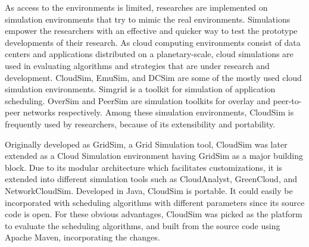 \documentclass[times, 10pt,twocolumn]{article}
\begin{document}
As access to the environments is limited, researches are implemented on simulation environments that try to mimic the real environments. Simulations empower the researchers with an effective and quicker way to test the prototype developments of their research. As cloud computing environments consist of data centers and applications distributed on a planetary-scale, cloud simulations are used in evaluating algorithms and strategies that are under research and development. CloudSim, EmuSim\cite{emusim}, and DCSim\cite{dcsim} are some of the mostly used cloud simulation environments. Simgrid\cite{simgrid} is a toolkit for simulation of application scheduling. OverSim\cite{oversim} and PeerSim\cite{peersim} are simulation toolkits for overlay and peer-to-peer networks respectively. Among these simulation environments, CloudSim is frequently used by researchers, because of its extensibility and portability. 

Originally developed as GridSim, a Grid Simulation tool, CloudSim was later extended as a Cloud Simulation environment having GridSim as a major building block\cite{cloudgridsim}. Due to its modular architecture which facilitates customizations, it is extended into different simulation tools such as CloudAnalyst\cite{cloudanalyst}, GreenCloud\cite{greencloud}, and NetworkCloudSim\cite{ncloudsim}. Developed in Java, CloudSim is portable. It could easily be incorporated with scheduling algorithms with different parameters since its source code is open. For these obvious advantages, CloudSim was picked as the platform to evaluate the scheduling algorithms, and built from the source code using Apache Maven, incorporating the changes. 
\end{document}

